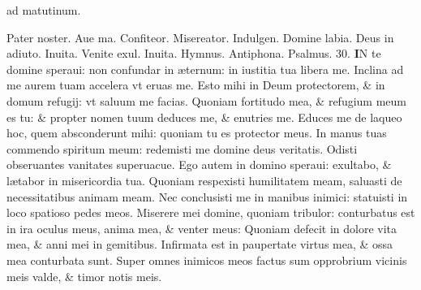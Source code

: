 \documentclass[a5paper,10pt]{book}
\def\ae{æ}
\begin{document}
\begin{multicols*}{2}
\begin{center}
\normalsize ad matutinum.
\end{center}
\vspace{-1em}
\par \noindent \color{red} P\color{black}ater noster. Aue ma. Confiteor. Misereator. Indulgen. Domine labia. Deus in adiuto. \color{red} Inuita. \color{black} Venite exul. \color{red} Inuita. Hymnus. Antiphona. \quad Psalmus. \hypertarget{ps30}{30.} \color{black}
\lettrine[lines=2]{\bfseries \color{red} I}{}N te domine speraui: non confundar in \ae ternum: in iustitia tua libera me.
\newline \color{red} I\color{black}nclina ad me aurem tuam accelera vt eruas me.
\newline \color{red} E\color{black}sto mihi in Deum protectorem, \& in domum refugij: vt saluum me facias.
\newline \color{red} Q\color{black}uoniam fortitudo mea, \& refugium meum es tu: \& propter nomen tuum deduces me, \& enutries me.
\newline \color{red} E\color{black}duces me de laqueo hoc, quem absconderunt mihi: quoniam tu es protector meus.
\newline \color{red} I\color{black}n manus tuas commendo spiritum meum: redemisti me domine deus veritatis.
\newline \color{red} O\color{black}disti obseruantes vanitates superuacue.
\newline \color{red} E\color{black}go autem in domino speraui: exultabo, \& l\ae tabor in misericordia tua.
\newline \color{red} Q\color{black}uoniam respexisti humilitatem meam, saluasti de necessitatibus animam meam.
\newline \color{red} N\color{black}ec conclusisti me in manibus inimici: statuisti in loco spatioso pedes meos.
\newline \color{red} M\color{black}iserere mei domine, quoniam tribulor: conturbatus est in ira oculus meus, anima mea, \& venter meus:
\newline \color{red} Q\color{black}uoniam defecit in dolore vita mea, \& anni mei in gemitibus.
\newline \color{red} I\color{black}nfirmata est in paupertate virtus mea, \& ossa mea conturbata sunt.
\newline \color{red} S\color{black}uper omnes inimicos meos factus sum opprobrium vicinis meis valde, \& timor notis meis.

\end{multicols*}
\end{document}
